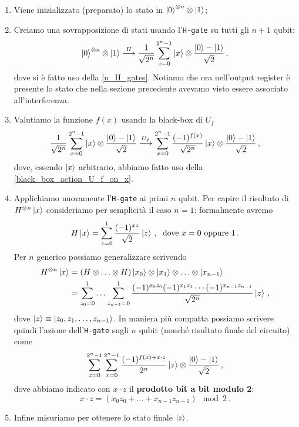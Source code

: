 \begin{enumerate}
    \item Viene inizializzato (preparato) lo stato in $\ket{0}^{\otimes n} \otimes \ket{1}$;
    \item Creiamo una sovrapposizione di stati usando l'\texttt{H-gate} su tutti gli $n+1$ qubit:
        \begin{equation*}
            \ket{0}^{\otimes n} \otimes \ket{1} \overset{H}{\longrightarrow} \frac{1}{\sqrt {2^n}}\sum_{x=0}^{2^n-1}\ket x \otimes \frac{\ket 0 - \ket 1}{\sqrt 2} \, ,
        \end{equation*}
        dove si è fatto uso della \eqref{n_H_gates}. Notiamo che ora nell'output register è presente lo stato che nella sezione precedente avevamo visto essere associato all'interferenza. 
    \item Valutiamo la funzione $f(x)$ usando la black-box di $U_f$
        \begin{equation}\label{dopo_U_f}
            \frac{1}{\sqrt {2^n}}\sum_{x=0}^{2^n-1}\ket x \otimes \frac{\ket 0 - \ket 1}{\sqrt 2} \overset{U_f}{\longrightarrow} \sum_{x=0}^{2^n-1}\frac{(-1)^{f(x)}}{\sqrt{2^n}}\ket x \otimes \frac{\ket 0 - \ket 1}{\sqrt 2} \, ,
        \end{equation}
        dove, essendo $\ket{x}$ arbitrario, abbiamo fatto uso della \eqref{black_box_action_U_f_on_x}. 
    \item Applichiamo nuovamente l'\texttt{H-gate} ai primi $n$ qubit. Per capire il risultato di $H^{\otimes n} \ket{x}$ consideriamo per semplicità il caso $n=1$: formalmente avremo 
    \begin{equation*}
        H \ket{x} = \sum_{z = 0}^1 \frac{(-1)^{xz}}{\sqrt{2}} \ket{z} \, , \; \text{ dove } x = 0 \text{ oppure } 1 \, .
    \end{equation*}
    Per $n$ generico possiamo generalizzare scrivendo
    \begin{align*}
        H^{\otimes n} \ket{x} &= (H \otimes \ldots \otimes H) \ket{x_0} \otimes \ket{x_1} \otimes \ldots \otimes \ket{x_{n-1}} \\
        &= \sum_{z_0=0}^1 \ldots \sum_{z_{n-1}=0}^1 \frac{(-1)^{x_0 z_0} (-1)^{x_1 z_1} \cdots (-1)^{x_{n-1} z_{n-1}}}{\sqrt{2^n}} \ket{z} \, ,
    \end{align*}
    dove $\ket{z} \equiv \ket{z_0, z_1, \ldots, z_{n-1}}$. In maniera più compatta possiamo scrivere quindi l'azione dell'\texttt{H-gate} sugli $n$ qubit (nonché risultato finale del circuito) come
        \begin{equation}\label{output_Deutsch_Jozsa}
            \sum_{z = 0}^{2^n-1} \sum_{x = 0}^{2^n-1} \frac{(-1)^{f(x) + x \cdot z}}{2^n}\ket z \otimes \frac{\ket 0 - \ket 1}{\sqrt 2} \, ,
        \end{equation}
        dove abbiamo indicato con $x\cdot z$ il \textbf{prodotto bit a bit modulo 2}:
        \begin{equation*}
            x\cdot z = (x_0z_0 + \ldots + x_{n-1}z_{n-1}) \mod{2} \, .
        \end{equation*}
    \item Infine misuriamo per ottenere lo stato finale $\ket{z}$. 
\end{enumerate}

